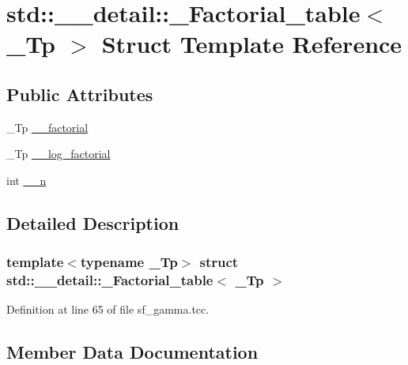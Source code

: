 \hypertarget{structstd_1_1____detail_1_1__Factorial__table}{}\section{std\+:\+:\+\_\+\+\_\+detail\+:\+:\+\_\+\+Factorial\+\_\+table$<$ \+\_\+\+Tp $>$ Struct Template Reference}
\label{structstd_1_1____detail_1_1__Factorial__table}
\subsection*{Public Attributes}
\begin{DoxyCompactItemize}
\item 
\+\_\+\+Tp \hyperlink{structstd_1_1____detail_1_1__Factorial__table_a4e8d20f3fa301037b097bb9f8e5f2060}{\+\_\+\+\_\+factorial}
\item 
\+\_\+\+Tp \hyperlink{structstd_1_1____detail_1_1__Factorial__table_a9d4b412d4d8b46ec660b0441516f412c}{\+\_\+\+\_\+log\+\_\+factorial}
\item 
int \hyperlink{structstd_1_1____detail_1_1__Factorial__table_a08dfe7484fca4bcdd1969ce2fa73edc6}{\+\_\+\+\_\+n}
\end{DoxyCompactItemize}


\subsection{Detailed Description}
\subsubsection*{template$<$typename \+\_\+\+Tp$>$\newline
struct std\+::\+\_\+\+\_\+detail\+::\+\_\+\+Factorial\+\_\+table$<$ \+\_\+\+Tp $>$}



Definition at line 65 of file sf\+\_\+gamma.\+tcc.



\subsection{Member Data Documentation}
\mbox{\label{structstd_1_1____detail_1_1__Factorial__table_a4e8d20f3fa301037b097bb9f8e5f2060}} 
